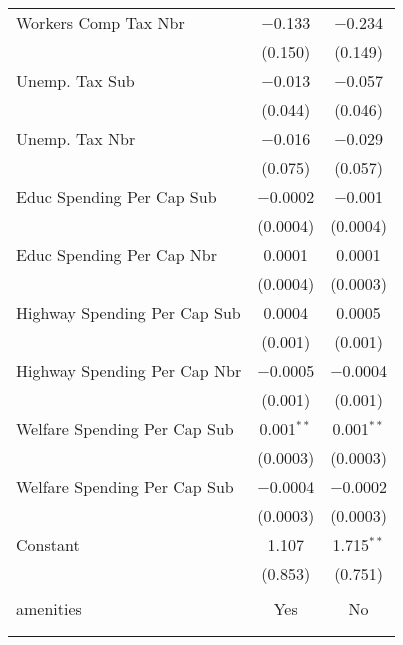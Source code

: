 \begin{table}[!htbp]
\begin{tabular}{@{\extracolsep{5pt}}lcc}
  Workers Comp Tax Nbr & $-$0.133 & $-$0.234 \\ 
  & (0.150) & (0.149) \\ 
  Unemp. Tax Sub & $-$0.013 & $-$0.057 \\ 
  & (0.044) & (0.046) \\ 
  Unemp. Tax Nbr & $-$0.016 & $-$0.029 \\ 
  & (0.075) & (0.057) \\ 
  Educ Spending Per Cap Sub & $-$0.0002 & $-$0.001 \\ 
  & (0.0004) & (0.0004) \\ 
  Educ Spending Per Cap Nbr & 0.0001 & 0.0001 \\ 
  & (0.0004) & (0.0003) \\ 
  Highway Spending Per Cap Sub & 0.0004 & 0.0005 \\ 
  & (0.001) & (0.001) \\ 
  Highway Spending Per Cap Nbr & $-$0.0005 & $-$0.0004 \\ 
  & (0.001) & (0.001) \\ 
  Welfare Spending Per Cap Sub & 0.001$^{**}$ & 0.001$^{**}$ \\ 
  & (0.0003) & (0.0003) \\ 
  Welfare Spending Per Cap Sub & $-$0.0004 & $-$0.0002 \\ 
  & (0.0003) & (0.0003) \\ 
  Constant & 1.107 & 1.715$^{**}$ \\ 
  & (0.853) & (0.751) \\ 
 \hline \\[-1.8ex] 
amenities & Yes & No \\ 
\hline \\[-1.8ex] 
\hline 
\hline \\[-1.8ex] 
\end{tabular} 
\end{table} 
